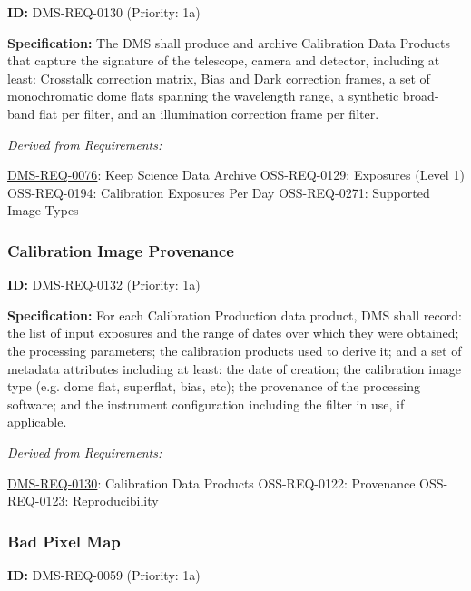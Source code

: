 \documentclass[SE,toc,lsstdraft]{lsstdoc}
\begin{document}
\label{DMS-REQ-0130}
\textbf{ID:} DMS-REQ-0130 (Priority: 1a)

\textbf{Specification:} The DMS shall produce and archive Calibration Data Products that capture the signature of the telescope, camera and detector, including at least: Crosstalk correction matrix, Bias and Dark correction frames, a set of monochromatic dome flats spanning the wavelength range, a synthetic broad-band flat per filter, and an illumination correction frame per filter.

\emph{Derived from Requirements:}

\hyperref[DMS-REQ-0076]{DMS-REQ-0076}:
Keep Science Data Archive \newline
OSS-REQ-0129:
Exposures (Level 1) \newline
OSS-REQ-0194:
Calibration Exposures Per Day \newline
OSS-REQ-0271:
Supported Image Types \newline

\subsubsection{Calibration Image Provenance}

\label{DMS-REQ-0132}
\textbf{ID:} DMS-REQ-0132 (Priority: 1a)

\textbf{Specification:} For each Calibration Production data product, DMS shall record: the list of input exposures and the range of dates over which they were obtained; the processing parameters; the calibration products used to derive it; and a set of metadata attributes including at least: the date of creation; the calibration image type (e.g. dome flat, superflat, bias, etc); the provenance of the processing software; and the instrument configuration including the filter in use, if applicable.

\emph{Derived from Requirements:}

\hyperref[DMS-REQ-0130]{DMS-REQ-0130}:
Calibration Data Products \newline
OSS-REQ-0122:
Provenance \newline
OSS-REQ-0123:
Reproducibility \newline

\subsubsection{Bad Pixel Map}

\label{DMS-REQ-0059}
\textbf{ID:} DMS-REQ-0059 (Priority: 1a)
\end{document}
